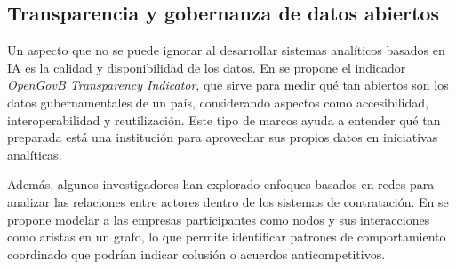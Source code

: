 \subsection{Transparencia y gobernanza de datos abiertos}

Un aspecto que no se puede ignorar al desarrollar sistemas analíticos basados en IA es la calidad y disponibilidad de los datos. En \cite{milic2022using} se propone el indicador \textit{OpenGovB Transparency Indicator}, que sirve para medir qué tan abiertos son los datos gubernamentales de un país, considerando aspectos como accesibilidad, interoperabilidad y reutilización. Este tipo de marcos ayuda a entender qué tan preparada está una institución para aprovechar sus propios datos en iniciativas analíticas.

Además, algunos investigadores han explorado enfoques basados en redes para analizar las relaciones entre actores dentro de los sistemas de contratación. En \cite{wachs2019network} se propone modelar a las empresas participantes como nodos y sus interacciones como aristas en un grafo, lo que permite identificar patrones de comportamiento coordinado que podrían indicar colusión o acuerdos anticompetitivos.
